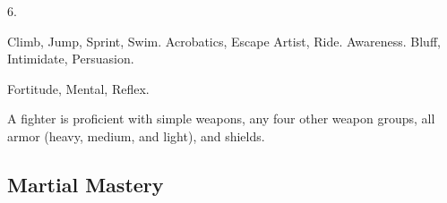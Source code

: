          6.

         Climb, Jump, Sprint, Swim.
         Acrobatics, Escape Artist, Ride.
         Awareness.
         Bluff, Intimidate, Persuasion.

          Fortitude,  Mental,  Reflex.

        A fighter is proficient with simple weapons, any four other weapon groups,  all armor (heavy, medium, and light), and shields.


        \subsection{Martial Mastery}

